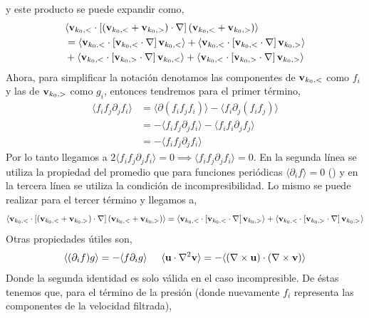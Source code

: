 \documentclass[executivepaper,12pt]{article}
\numberwithin{equation}{section}
\begin{document}
 y este producto se puede expandir como,
 \begin{align*}
 	&\langle \vb{v}_{k_0,<} \cdot \left[(\vb{v}_{k_0,<}+\vb{v}_{k_0,>})\cdot\vb{\nabla}\right](\vb{v}_{k_0,<}+\vb{v}_{k_0,>})\rangle\\
 	&=\langle \vb{v}_{k_0,<} \cdot \left[\vb{v}_{k_0,<}\cdot\vb{\nabla}\right]\vb{v}_{k_0,<}\rangle+\langle \vb{v}_{k_0,<} \cdot \left[\vb{v}_{k_0,<}\cdot\vb{\nabla}\right]\vb{v}_{k_0,>}\rangle\\
 	&+\langle \vb{v}_{k_0,<} \cdot \left[\vb{v}_{k_0,>}\cdot\vb{\nabla}\right]\vb{v}_{k_0,<}\rangle+\langle \vb{v}_{k_0,<} \cdot \left[\vb{v}_{k_0,>}\cdot\vb{\nabla}\right]\vb{v}_{k_0,>}\rangle
 \end{align*}
 Ahora, para simplificar la notación denotamos las componentes de $\vb{v}_{k_0,<}$ como $f_i$ y las de $\vb{v}_{k_0,>}$ como $g_i$, entonces tendremos para el primer término,
 \begin{align*}
    \langle f_i f_j \partial_j f_i \rangle &= \langle \partial(f_if_jf_i) \rangle-\langle f_i \partial_j (f_i f_j) \rangle\\
    &=-\langle f_i f_j \partial_j f_i \rangle-\langle f_i f_i \partial_j f_j \rangle\\
    &=-\langle f_i f_j \partial_j f_i \rangle
 \end{align*} 
 Por lo tanto llegamos a $2\langle f_i f_j \partial_j f_i \rangle=0\implies \langle f_i f_j \partial_j f_i \rangle=0$. En la segunda línea se utiliza la propiedad del promedio que para funciones periódicas $\langle\partial_i f\rangle=0$ (\parencite{frisch1995}) y en la tercera línea se utiliza la condición de incompresibilidad. Lo mismo se puede realizar para el tercer término y llegamos a,
 \begin{equation*}
 	\langle \vb{v}_{k_0,<} \cdot \left[(\vb{v}_{k_0,<}+\vb{v}_{k_0,>})\cdot\vb{\nabla}\right](\vb{v}_{k_0,<}+\vb{v}_{k_0,>})\rangle=\langle \vb{v}_{k_0,<} \cdot \left[\vb{v}_{k_0,<}\cdot\vb{\nabla}\right]\vb{v}_{k_0,>}\rangle+\langle \vb{v}_{k_0,<} \cdot \left[\vb{v}_{k_0,>}\cdot\vb{\nabla}\right]\vb{v}_{k_0,>}\rangle
 \end{equation*}
Otras propiedades útiles son,
\begin{equation*}
	\langle (\partial_i f) g \rangle=-\langle f\partial_i g \rangle \hspace{0.5cm} \langle \vb{u}\cdot \nabla^2\vb{v} \rangle=-\langle (\nabla\times\vb{u})\cdot(\nabla\times\vb{v}) \rangle
\end{equation*}
 Donde la segunda identidad es solo válida en el caso incompresible. De éstas tenemos que, para el término de la presión (donde nuevamente $f_i$ representa las componentes de la velocidad filtrada),
\end{document}
